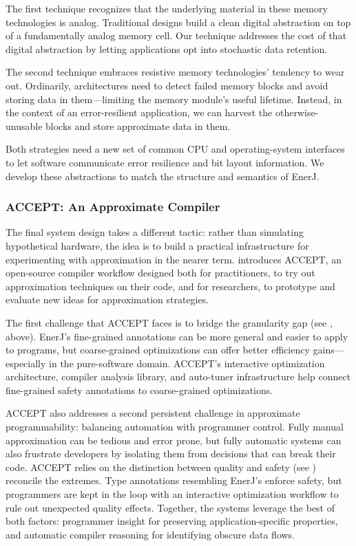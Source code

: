 The first technique recognizes that the underlying material in these memory
technologies is analog.
Traditional designs build a clean digital abstraction on top of a
fundamentally analog memory cell.
Our technique addresses the cost of that digital abstraction by letting
applications opt into stochastic data retention.

The second technique embraces resistive memory technologies' tendency to wear
out.
Ordinarily, architectures need to detect failed memory blocks and avoid
storing data in them---limiting the memory module's useful lifetime.
Instead, in the context of an error-resilient application, we can harvest the otherwise-unusable
blocks and store approximate data in them.

Both strategies need a new set of common CPU and operating-system interfaces
to let software communicate error resilience and bit layout information.
We develop these abstractions to match the structure and semantics of EnerJ.

\subsubsection{ACCEPT: An Approximate Compiler}

The final system design takes a different tactic:
rather than simulating hypothetical hardware,
the idea is to build a practical infrastructure for experimenting with
approximation in the nearer term.
 introduces ACCEPT, an open-source compiler workflow designed both for
practitioners, to try out approximation techniques on their code,
and for researchers, to prototype and evaluate new ideas for approximation
strategies.

The first challenge that ACCEPT faces is to bridge the granularity gap (see
, above).
EnerJ's fine-grained annotations can be more general and easier to apply to
programs,
but coarse-grained optimizations can offer better efficiency
gains---especially in the pure-software domain.
ACCEPT's interactive optimization architecture,
compiler analysis library,
and auto-tuner infrastructure help connect fine-grained safety annotations to
coarse-grained optimizations.

ACCEPT also addresses a second persistent challenge in approximate
programmability:
balancing automation with programmer control.
Fully manual approximation can be tedious and error prone,
but fully automatic systems can also frustrate developers by isolating them
from decisions that can break their code.
ACCEPT relies on the distinction between quality and safety (see
) reconcile the extremes.
Type annotations resembling EnerJ's enforce safety, but programmers are kept
in the loop with an interactive optimization workflow to rule out unexpected
quality effects.
Together, the systems leverage the best of both factors:
programmer insight for preserving application-specific properties,
and automatic compiler reasoning for identifying obscure data flows.

